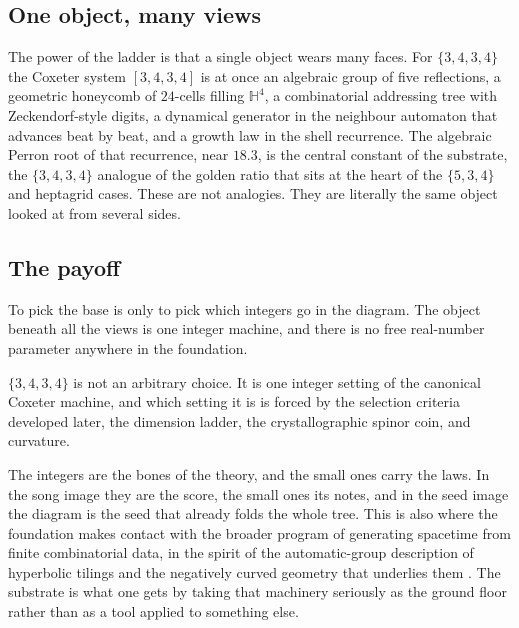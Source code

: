 \subsection{One object, many views}

The power of the ladder is that a single object wears many faces. For $\{3,4,3,4\}$ the Coxeter system
$[3,4,3,4]$ is at once an algebraic group of five reflections, a geometric honeycomb of $24$-cells filling
$\mathbb{H}^4$, a combinatorial addressing tree with Zeckendorf-style digits, a dynamical generator in the
neighbour automaton that advances beat by beat, and a growth law in the shell recurrence. The algebraic Perron
root of that recurrence, near $18.3$, is the central constant of the substrate, the $\{3,4,3,4\}$ analogue of the
golden ratio that sits at the heart of the $\{5,3,4\}$ and heptagrid cases. These are not analogies. They are
literally the same object looked at from several sides.

\subsection{The payoff}

To pick the base is only to pick which integers go in the diagram. The object beneath all the views is one
integer machine, and there is no free real-number parameter anywhere in the foundation.

\begin{proposition}
$\{3,4,3,4\}$ is not an arbitrary choice. It is one integer setting of the canonical Coxeter machine, and which
setting it is is forced by the selection criteria developed later, the dimension ladder, the crystallographic
spinor coin, and curvature.
\end{proposition}

The integers are the bones of the theory, and the small ones carry the laws. In the song image they are the
score, the small ones its notes, and in the seed image the diagram is the seed that already folds the whole tree.
This is also where the foundation
makes contact with the broader program of generating spacetime from finite combinatorial data, in the spirit of
the automatic-group description of hyperbolic tilings \cite{cannon1997} and the negatively curved geometry that
underlies them \cite{gromov1987}. The substrate is what one gets by taking that machinery seriously as the
ground floor rather than as a tool applied to something else.
